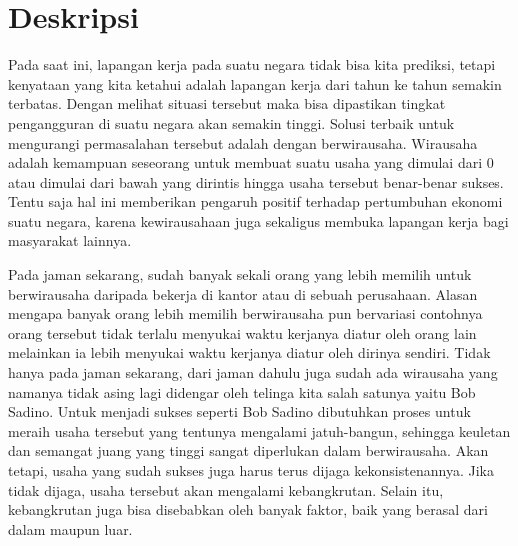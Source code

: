 \documentclass[a4paper,twoside]{article}
\begin{document}
\title{\@judultopik}
\author{\nama \textendash \@npm} 

\newcommand{\nama}{Vanessa Sukamto}
\newcommand{\@npm}{2014730010}
\newcommand{\@judultopik}{Simulator Pertumbuhan Wirausaha Berbasis Cellular Automata} %
\newcommand{\jumpemb}{1} %
\newcommand{\tanggal}{01/01/1900}


\maketitle


\section{Deskripsi}
Pada saat ini, lapangan kerja pada suatu negara tidak bisa kita prediksi, tetapi kenyataan yang kita ketahui adalah lapangan kerja dari tahun ke tahun semakin terbatas. Dengan melihat situasi tersebut maka bisa dipastikan tingkat pengangguran di suatu negara akan semakin tinggi. Solusi terbaik untuk mengurangi permasalahan tersebut adalah dengan berwirausaha. Wirausaha adalah kemampuan seseorang untuk membuat suatu usaha yang dimulai dari 0 atau dimulai dari bawah yang dirintis hingga usaha tersebut benar-benar sukses. Tentu saja hal ini memberikan pengaruh positif terhadap pertumbuhan ekonomi suatu negara, karena kewirausahaan juga sekaligus membuka lapangan kerja bagi masyarakat lainnya.

 
Pada jaman sekarang, sudah banyak sekali orang yang lebih memilih untuk berwirausaha daripada bekerja di kantor atau di sebuah perusahaan.  Alasan mengapa banyak orang lebih memilih berwirausaha pun bervariasi contohnya orang tersebut tidak terlalu menyukai waktu kerjanya diatur oleh orang lain melainkan ia lebih menyukai waktu kerjanya diatur oleh dirinya sendiri. Tidak hanya pada jaman sekarang, dari jaman dahulu juga sudah ada wirausaha yang namanya tidak asing lagi didengar oleh telinga kita salah satunya yaitu Bob Sadino. Untuk menjadi sukses seperti Bob Sadino dibutuhkan proses untuk meraih usaha tersebut yang tentunya mengalami jatuh-bangun, sehingga keuletan dan semangat juang yang tinggi sangat diperlukan dalam berwirausaha. Akan tetapi, usaha yang sudah sukses juga harus terus dijaga kekonsistenannya. Jika tidak dijaga, usaha tersebut akan mengalami kebangkrutan. Selain itu, kebangkrutan juga bisa disebabkan oleh banyak faktor, baik yang berasal dari dalam maupun luar.
\end{document}

